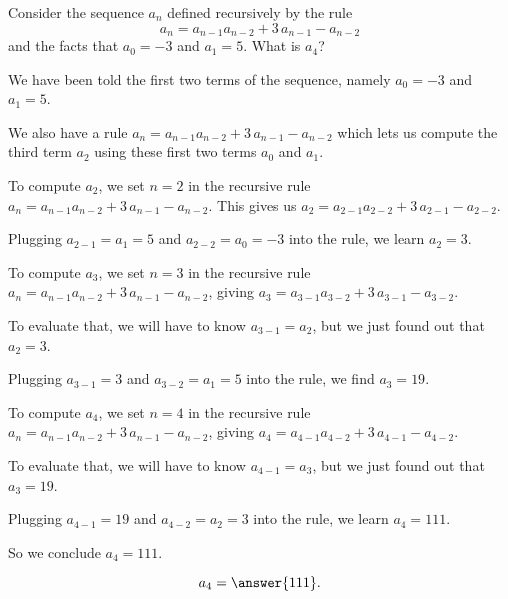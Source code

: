 \documentclass{ximera}
\begin{document}
\begin{question}
  Consider the sequence $a_{n}$ defined recursively by the
  rule
  \[
  a_n = {a_{n-1}} {a_{n-2}} + 3 \, {a_{n-1}} - {a_{n-2}}
  \]
  and the facts that $a_0 = -3$ and $a_1 = 5$.  What is $a_4$?
  
    \begin{hint}
      We have been told the first two terms of the sequence, namely $a_0 = -3$ and $a_1 = 5$.
    \end{hint}
    \begin{hint}
      We also have a rule $a_n = {a_{n-1}} {a_{n-2}} + 3 \, {a_{n-1}} - {a_{n-2}}$ which lets us compute the third term $a_2$ using these first two terms $a_0$ and $a_1$.
    \end{hint}
    \begin{hint}
      To compute $a_2$, we set $n = 2$ in the recursive rule $a_n = {a_{n-1}} {a_{n-2}} + 3 \, {a_{n-1}} - {a_{n-2}}$.  This gives us $a_2 = {a_{2-1}} {a_{2-2}} + 3 \, {a_{2-1}} - {a_{2-2}}$.
    \end{hint}
    \begin{hint}
      Plugging $a_{2-1} = a_{1} = 5$ and $a_{2-2} = a_{0} = -3$ into the rule, we learn $a_2 = 3$.
    \end{hint}
    \begin{hint}
      To compute $a_3$, we set $n = 3$ in the recursive rule $a_n = {a_{n-1}} {a_{n-2}} + 3 \, {a_{n-1}} - {a_{n-2}}$, giving $a_3 = {a_{3-1}} {a_{3-2}} + 3 \, {a_{3-1}} - {a_{3-2}}$.
    \end{hint}
    \begin{hint}
      To evaluate that, we will have to know $a_{3-1} = a_{2}$, but we just found out that $a_{2} = 3$.
    \end{hint}
    \begin{hint}
      Plugging $a_{3-1} = 3$ and $a_{3-2} = a_{1} = 5$ into the rule, we find $a_3 = 19$.
    \end{hint}
    \begin{hint}
      To compute $a_4$, we set $n = 4$ in the recursive rule $a_n = {a_{n-1}} {a_{n-2}} + 3 \, {a_{n-1}} - {a_{n-2}}$, giving $a_4 = {a_{4-1}} {a_{4-2}} + 3 \, {a_{4-1}} - {a_{4-2}}$.
    \end{hint}
    \begin{hint}
      To evaluate that, we will have to know $a_{4-1} = a_{3}$, but we just found out that $a_{3} = 19$.
    \end{hint}
    \begin{hint}
      Plugging $a_{4-1} = 19$ and $a_{4-2} = a_{2} = 3$ into the rule, we learn $a_4 = 111$.
    \end{hint}
    \begin{hint}
      So we conclude $a_4 = 111$.
    \end{hint}
    \begin{prompt}
      \[
      a_4 = \answer{111}.
      \]
    \end{prompt}
\end{question}
\end{document}
